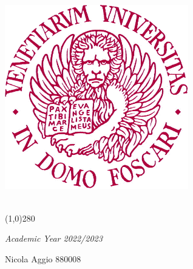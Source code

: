 \newcommand{\image}[3]{ %
	\begin{figure}[H]
		\centering
		\texttt{[image: \#1]} 
		\caption{#2}
	\end{figure}
	\FloatBarrier
}

\newcommand{\imageb}[2]{ %
	\begin{figure}[H]
		\centering
		\texttt{[image: \#1]} 
	\end{figure}
	\FloatBarrier
}

\newcommand{\imageLabel}[4]{ %
	\begin{figure}[H]
		\centering
		\texttt{[image: \#1]} 
		\caption{#2}
		\label{fig:#4}
	\end{figure}
	\FloatBarrier
}
\newcommand{\Z}{\mathbb{Z}}

\begin{titlepage}
	\begin{center}
		\includegraphics[width=0.6\textwidth]{unive}
		
		\vspace*{1cm}
		\LARGE
		
		\vspace{0.5cm}
		\Huge
		\textbf{\titolo}\\
		
		\line(1,0){280}
		
		\vspace{0.5cm}
		\large
		\textit{Academic Year 2022/2023}
		
		\vfill
		
	\end{center}
	\begin{raggedleft}
		\Large
		\large
		Nicola Aggio 880008\\
	\end{raggedleft}
\end{titlepage}

